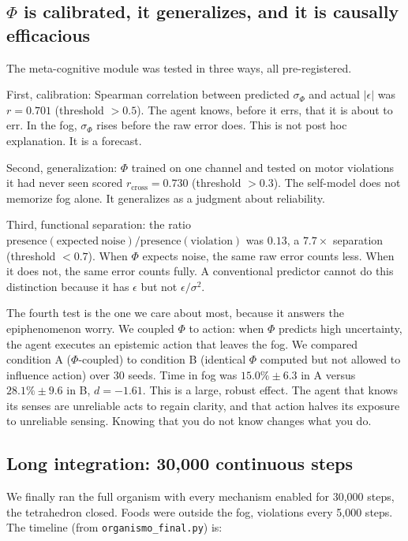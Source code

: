 \documentclass[11pt,a4paper]{article}
\begin{document}
\subsection{\texorpdfstring{$\Phi$}{Phi} is calibrated, it generalizes, and it is causally efficacious}

The meta-cognitive module was tested in three ways, all pre-registered.

First, calibration: Spearman correlation between predicted $\sigma_\Phi$ and actual $|\epsilon|$ was $r=0.701$ (threshold $>0.5$). The agent knows, before it errs, that it is about to err. In the fog, $\sigma_\Phi$ rises before the raw error does. This is not post hoc explanation. It is a forecast.

Second, generalization: $\Phi$ trained on one channel and tested on motor violations it had never seen scored $r_{\mathrm{cross}}=0.730$ (threshold $>0.3$). The self-model does not memorize fog alone. It generalizes as a judgment about reliability.

Third, functional separation: the ratio $\mathrm{presence}(\mathrm{expected\ noise})/\mathrm{presence}(\mathrm{violation})$ was $0.13$, a $7.7\times$ separation (threshold $<0.7$). When $\Phi$ expects noise, the same raw error counts less. When it does not, the same error counts fully. A conventional predictor cannot do this distinction because it has $\epsilon$ but not $\epsilon/\sigma^2$.

The fourth test is the one we care about most, because it answers the epiphenomenon worry. We coupled $\Phi$ to action: when $\Phi$ predicts high uncertainty, the agent executes an epistemic action that leaves the fog. We compared condition A ($\Phi$-coupled) to condition B (identical $\Phi$ computed but not allowed to influence action) over 30 seeds. Time in fog was $15.0\% \pm 6.3$ in A versus $28.1\% \pm 9.6$ in B, $d=-1.61$. This is a large, robust effect. The agent that knows its senses are unreliable acts to regain clarity, and that action halves its exposure to unreliable sensing. Knowing that you do not know changes what you do.

\subsection{Long integration: 30,000 continuous steps}

We finally ran the full organism with every mechanism enabled for 30,000 steps, the tetrahedron closed. Foods were outside the fog, violations every 5,000 steps. The timeline (from \texttt{organismo\_final.py}) is:
\end{document}
